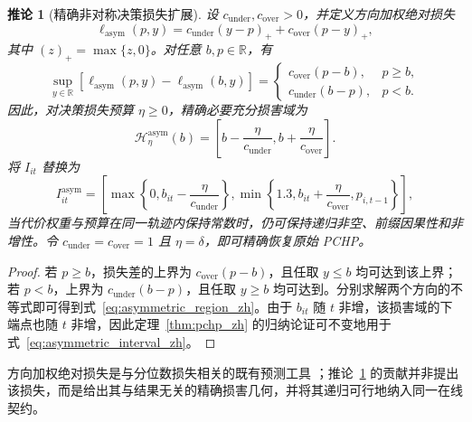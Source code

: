 \documentclass[UTF8,11pt]{ctexart}
\newtheorem{corollary}{推论}
\newcommand{\R}{\mathbb{R}}
\begin{document}
\begin{corollary}[精确非对称决策损失扩展]
\label{cor:asymmetric_zh}
设 $c_{\mathrm{under}},c_{\mathrm{over}}>0$，并定义方向加权绝对损失
\begin{equation}
  \ell_{\mathrm{asym}}(p,y)
  =c_{\mathrm{under}}(y-p)_{+}
  +c_{\mathrm{over}}(p-y)_{+},
  \label{eq:asymmetric_loss_zh}
\end{equation}
其中 $(z)_{+}=\max\{z,0\}$。对任意 $b,p\in\R$，有
\begin{equation}
  \sup_{y\in\R}\!\left[
  \ell_{\mathrm{asym}}(p,y)-\ell_{\mathrm{asym}}(b,y)
  \right]
  =
  \begin{cases}
    c_{\mathrm{over}}(p-b), & p\geq b,\\
    c_{\mathrm{under}}(b-p), & p<b.
  \end{cases}
  \label{eq:asymmetric_identity_zh}
\end{equation}
因此，对决策损失预算 $\eta\geq0$，精确必要充分损害域为
\begin{equation}
  \mathcal H^{\mathrm{asym}}_{\eta}(b)
  =\left[b-\frac{\eta}{c_{\mathrm{under}}},
          b+\frac{\eta}{c_{\mathrm{over}}}\right].
  \label{eq:asymmetric_region_zh}
\end{equation}
将 $I_{it}$ 替换为
\begin{equation}
  I^{\mathrm{asym}}_{it}
  =\left[
  \max\!\left\{0,b_{it}-\frac{\eta}{c_{\mathrm{under}}}\right\},
  \min\!\left\{1.3,b_{it}+\frac{\eta}{c_{\mathrm{over}}},p_{i,t-1}\right\}
  \right],
  \label{eq:asymmetric_interval_zh}
\end{equation}
当代价权重与预算在同一轨迹内保持常数时，仍可保持递归非空、前缀因果性和非增性。令 $c_{\mathrm{under}}=c_{\mathrm{over}}=1$ 且 $\eta=\delta$，即可精确恢复原始 PCHP。
\end{corollary}
\begin{proof}
若 $p\geq b$，损失差的上界为 $c_{\mathrm{over}}(p-b)$，且任取 $y\leq b$ 均可达到该上界；若 $p<b$，上界为 $c_{\mathrm{under}}(b-p)$，且任取 $y\geq b$ 均可达到。分别求解两个方向的不等式即可得到式~\eqref{eq:asymmetric_region_zh}。由于 $b_{it}$ 随 $t$ 非增，该损害域的下端点也随 $t$ 非增，因此定理~\ref{thm:pchp_zh} 的归纳论证可不变地用于式~\eqref{eq:asymmetric_interval_zh}。
\end{proof}

方向加权绝对损失是与分位数损失相关的既有预测工具 \citep{koenker1978regression}；推论~\ref{cor:asymmetric_zh} 的贡献并非提出该损失，而是给出其与结果无关的精确损害几何，并将其递归可行地纳入同一在线契约。
\end{document}
